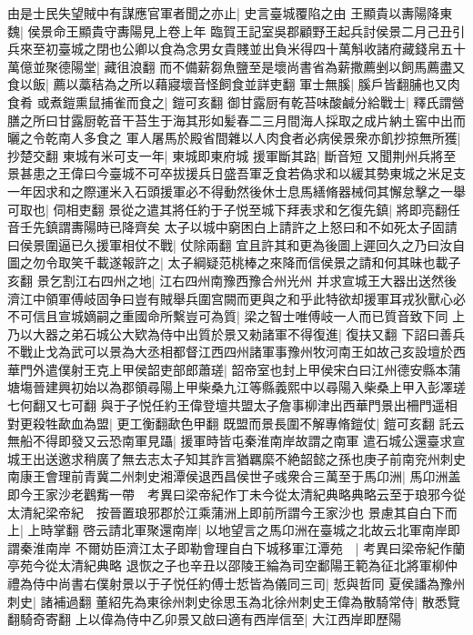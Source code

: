 由是士民失望賊中有謀應官軍者聞之亦止|{
	史言臺城覆陷之由}
王顯貴以夀陽降東魏|{
	侯景命王顯貴守夀陽見上卷上年}
臨賀王記室吳郡顧野王起兵討侯景二月己丑引兵來至初臺城之閉也公卿以食為念男女貴賤並出負米得四十萬斛收諸府藏錢帛五十萬億並聚德陽堂|{
	藏徂浪翻}
而不備薪芻魚鹽至是壞尚書省為薪撒薦剉以飼馬薦盡又食以飯|{
	薦以藁秸為之所以藉寢壞音怪飼食並詳吏翻}
軍士無膎|{
	膎戶皆翻脯也又肉食肴}
或煮鎧熏鼠捕雀而食之|{
	鎧可亥翻}
御甘露厨有乾苔味酸鹹分給戰士|{
	釋氏謂營膳之所曰甘露厨乾音干苔生于海其形如髪春二三月間海人採取之成片納土窖中出而曬之令乾南人多食之}
軍人屠馬於殿省間雜以人肉食者必病侯景衆亦飢抄掠無所獲|{
	抄楚交翻}
東城有米可支一年|{
	東城即東府城}
援軍斷其路|{
	斷音短}
又聞荆州兵將至景甚患之王偉曰今臺城不可卒拔援兵日盛吾軍乏食若偽求和以緩其勢東城之米足支一年因求和之際運米入石頭援軍必不得動然後休士息馬繕脩器械伺其懈怠擊之一舉可取也|{
	伺相吏翻}
景從之遣其將任約于子悦至城下拜表求和乞復先鎮|{
	將即亮翻任音壬先鎮謂夀陽時已降齊矣}
太子以城中窮困白上請許之上怒曰和不如死太子固請曰侯景圍逼已久援軍相仗不戰|{
	仗除兩翻}
宜且許其和更為後圖上遲回久之乃曰汝自圖之勿令取笑千載遂報許之|{
	太子綱疑范桃棒之來降而信侯景之請和何其昧也載子亥翻}
景乞割江右四州之地|{
	江右四州南豫西豫合州光州}
并求宣城王大器出送然後濟江中領軍傅岐固争曰豈有賊舉兵圍宫闕而更與之和乎此特欲却援軍耳戎狄獸心必不可信且宣城嫡嗣之重國命所繫豈可為質|{
	梁之智士唯傅岐一人而已質音致下同}
上乃以大器之弟石城公大欵為侍中出質於景又勑諸軍不得復進|{
	復扶又翻}
下詔曰善兵不戰止戈為武可以景為大丞相都督江西四州諸軍事豫州牧河南王如故己亥設壇於西華門外遣僕射王克上甲侯韶吏部郎蕭瑳|{
	韶帝室也封上甲侯宋白曰江州德安縣本蒲塘塲晉建興初始以為郡領尋陽上甲柴桑九江等縣義熙中以尋陽入柴桑上甲入彭凙瑳七何翻又七可翻}
與于子悦任約王偉登壇共盟太子詹事柳津出西華門景出柵門遥相對更殺牲歃血為盟|{
	更工衡翻歃色甲翻}
既盟而景長圍不解專脩鎧仗|{
	鎧可亥翻}
託云無船不得即發又云恐南軍見躡|{
	援軍時皆屯秦淮南岸故謂之南軍}
遣石城公還臺求宣城王出送邀求稍廣了無去志太子知其詐言猶羈縻不絶韶懿之孫也庚子前南兖州刺史南康王會理前青冀二州刺史湘潭侯退西昌侯世子彧衆合三萬至于馬卬洲|{
	馬卬洲盖即今王家沙老鸛觜一帶　考異曰梁帝紀作丁未今從太清紀典略典略云至于琅邪今從太清紀梁帝紀　按晉置琅邪郡於江乘蒲洲上即前所謂今王家沙也}
景慮其自白下而上|{
	上時掌翻}
啓云請北軍聚還南岸|{
	以地望言之馬卬洲在臺城之北故云北軍南岸即謂秦淮南岸}
不爾妨臣濟江太子即勒會理自白下城移軍江潭苑　|{
	考異曰梁帝紀作蘭亭苑今從太清紀典略}
退恢之子也辛丑以邵陵王綸為司空鄱陽王範為征北將軍柳仲禮為侍中尚書右僕射景以于子悦任約傅士悊皆為儀同三司|{
	悊與哲同}
夏侯譒為豫州刺史|{
	諸補過翻}
董紹先為東徐州刺史徐思玉為北徐州刺史王偉為散騎常侍|{
	散悉覽翻騎奇寄翻}
上以偉為侍中乙卯景又啟曰適有西岸信至|{
	大江西岸即歷陽}
